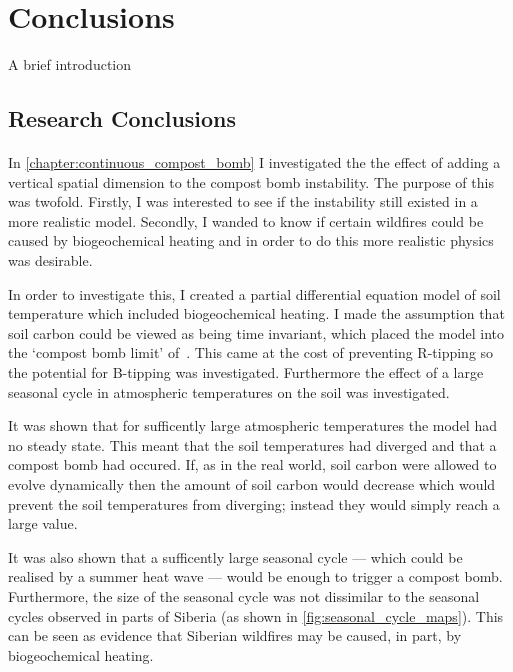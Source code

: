 \chapter{Conclusions}
\graphicspath{{conclusions/figs}}

A brief introduction

\section{Research Conclusions}
\subsubsection{}

In \cref{chapter:continuous_compost_bomb} I investigated the the effect of adding a vertical spatial dimension to the compost bomb instability.
The purpose of this was twofold. 
Firstly, I was interested to see if the instability still existed in a more realistic model.
Secondly, I wanded to know if certain wildfires could be caused by biogeochemical heating and in order to do this more realistic physics was desirable.


In order to investigate this, I created a partial differential equation model of soil temperature which included biogeochemical heating. I made the assumption
that soil carbon could be viewed as being time invariant, which placed the model into the `compost bomb limit' of~\cite{Luke2011}. This came at the cost of preventing
R-tipping so the potential for B-tipping was investigated. Furthermore the effect of a large seasonal cycle in atmospheric temperatures on the soil was investigated.

It was shown that for sufficently large atmospheric temperatures the model had no steady state. This meant that the soil temperatures had diverged and that a compost bomb
had occured. If, as in the real world, soil carbon were allowed to evolve dynamically then the amount of soil carbon would decrease which would prevent the soil temperatures from diverging;
instead they would simply reach a large value.

It was also shown that a sufficently large seasonal cycle --- which could be realised by a summer heat wave --- would be enough to trigger a compost bomb.
Furthermore, the size of the seasonal cycle was not dissimilar to the seasonal cycles observed in parts of Siberia (as shown in \cref{fig:seasonal_cycle_maps}).
This can be seen as evidence that Siberian wildfires may be caused, in part, by biogeochemical heating. 

